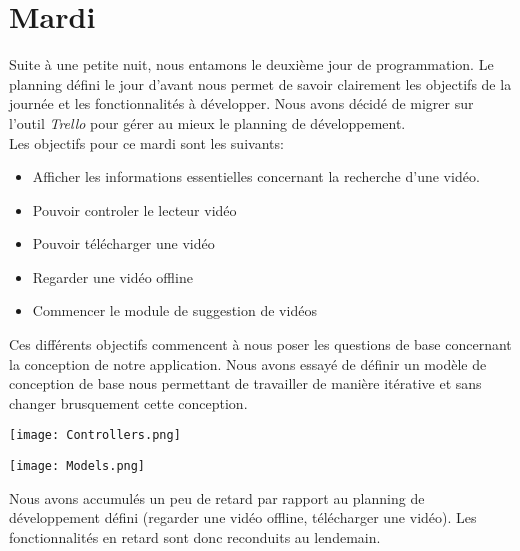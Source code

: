 \chapter{Mardi}

Suite à une petite nuit, nous entamons le deuxième jour de programmation. Le planning défini le jour d'avant nous permet de savoir clairement les objectifs de la journée et les fonctionnalités à développer. Nous avons décidé de migrer sur l'outil \textit{Trello} pour gérer au mieux le planning de développement.\\

\noindent Les objectifs pour ce mardi sont les suivants:
\begin{itemize}
	\item Afficher les informations essentielles concernant la recherche d'une vidéo.
	\item Pouvoir controler le lecteur vidéo
	\item Pouvoir télécharger une vidéo
	\item Regarder une vidéo offline
	\item Commencer le module de suggestion de vidéos\\
\end{itemize}


\noindent Ces différents objectifs commencent à nous poser les questions de base concernant la conception de notre application.
Nous avons essayé de définir un modèle de conception de base nous permettant de travailler de manière itérative et sans changer brusquement cette conception.

\begin{center}
	\texttt{[image: Controllers.png]}
\end{center}

\begin{center}
	\texttt{[image: Models.png]}
\end{center}


Nous avons accumulés un peu de retard par rapport au planning de développement défini (regarder une vidéo offline, télécharger une vidéo). Les fonctionnalités en retard sont donc reconduits au lendemain.